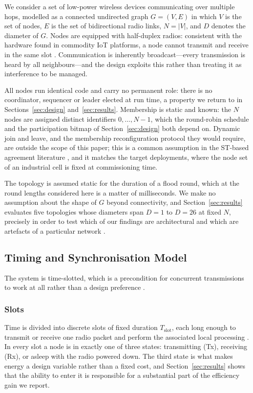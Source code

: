 \documentclass[journal]{IEEEtran}
\newcommand{\Nnodes}{N}                   %
\newcommand{\Diam}{D}                     %
\newcommand{\Tslot}{T_{\mathrm{slot}}}    %
\begin{document}
We consider a set of low-power wireless devices communicating over
multiple hops, modelled as a connected undirected graph $G = (V, E)$ in
which $V$ is the set of nodes, $E$ is the set of bidirectional radio
links, $\Nnodes = |V|$, and $\Diam$ denotes the diameter of $G$. Nodes
are equipped with half-duplex radios: consistent with the hardware found
in commodity IoT platforms, a node cannot transmit and receive in the same
slot \cite{zimmerling20survey}. Communication is inherently
broadcast---every transmission is heard by all neighbours---and the design
exploits this rather than treating it as interference to be managed.

All nodes run identical code and carry no permanent role: there is no
coordinator, sequencer or leader elected at run time, a property we return
to in Sections~\ref{sec:design} and~\ref{sec:results}. Membership is
static and known: the $\Nnodes$ nodes are assigned distinct identifiers
$0, \dots, \Nnodes-1$, which the round-robin schedule and the
participation bitmap of Section~\ref{sec:design} both depend on. Dynamic
join and leave, and the membership reconfiguration protocol they would
require, are outside the scope of this paper; this is a common assumption
in the ST-based agreement literature \cite{alnahas17a2},
\cite{poirot19paxos} and it matches the target deployments, where the node
set of an industrial cell is fixed at commissioning time.

The topology is assumed static for the duration of a flood round, which at
the round lengths considered here is a matter of milliseconds. We make no
assumption about the shape of $G$ beyond connectivity, and
Section~\ref{sec:results} evaluates five topologies whose diameters span
$\Diam = 1$ to $\Diam = 26$ at fixed $\Nnodes$, precisely in order to test
which of our findings are architectural and which are artefacts of a
particular network \cite{alnahas19blueflood}.

\subsection{Timing and Synchronisation Model}
\label{sec:model-timing}

The system is time-slotted, which is a precondition for concurrent
transmissions to work at all rather than a design preference
\cite{zimmerling20survey}.

\subsubsection{Slots}
Time is divided into discrete slots of fixed duration $\Tslot$, each long
enough to transmit or receive one radio packet and perform the associated
local processing \cite{ferrari11glossy}. In every slot a node is in
exactly one of three states: transmitting (Tx), receiving (Rx), or asleep
with the radio powered down. The third state is what makes energy a
design variable rather than a fixed cost, and
Section~\ref{sec:results} shows that the ability to enter it is
responsible for a substantial part of the efficiency gain we report.
\end{document}
